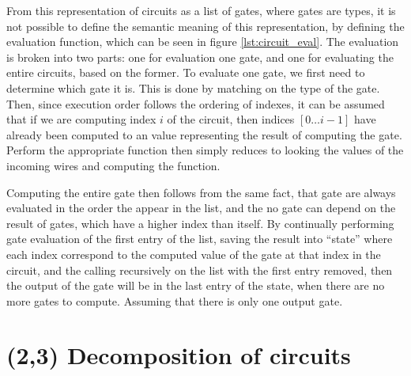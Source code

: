 From this representation of circuits as a list of gates, where gates are types,
it is not possible to define the semantic meaning of this representation, by
defining the evaluation function, which can be seen in figure \ref{lst:circuit_eval}.
The evaluation is broken into two parts: one for evaluation one gate, and one
for evaluating the entire circuits, based on the former.
To evaluate one gate, we first need to determine which gate it is. This is done
by matching on the type of the gate.
Then, since execution order follows the ordering of indexes, it can be assumed
that if we are computing index $i$ of the circuit, then indices $[0 \dots i-1]$
have already been computed to an value representing the result of computing the
gate. Perform the appropriate function then simply reduces to looking the values
of the incoming wires and computing the function.

Computing the entire gate then follows from the same fact, that gate are always
evaluated in the order the appear in the list, and the no gate can depend on
the result of gates, which have a higher index than itself. By continually
performing gate evaluation of the first entry of the list, saving the result
into ``state'' where each index correspond to the computed value of the gate at
that index in the circuit, and the calling recursively on the list with the
first entry removed, then the output of the gate will be in the last entry of
the state, when there are no more gates to compute. Assuming that there is only
one output gate.


\section{(2,3) Decomposition of circuits}
\label{sec:decomposition}




